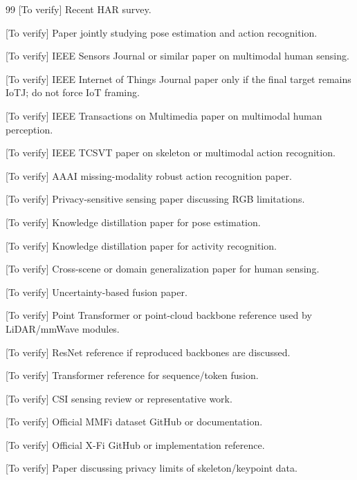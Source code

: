 \documentclass[journal]{IEEEtran}
\begin{document}
\begin{thebibliography}{99}
[To verify] Recent HAR survey.

[To verify] Paper jointly studying pose estimation and action recognition.

[To verify] IEEE Sensors Journal or similar paper on multimodal human sensing.

[To verify] IEEE Internet of Things Journal paper only if the final target remains IoTJ; do not force IoT framing.

[To verify] IEEE Transactions on Multimedia paper on multimodal human perception.

[To verify] IEEE TCSVT paper on skeleton or multimodal action recognition.

[To verify] AAAI missing-modality robust action recognition paper.

[To verify] Privacy-sensitive sensing paper discussing RGB limitations.

[To verify] Knowledge distillation paper for pose estimation.

[To verify] Knowledge distillation paper for activity recognition.

[To verify] Cross-scene or domain generalization paper for human sensing.

[To verify] Uncertainty-based fusion paper.

[To verify] Point Transformer or point-cloud backbone reference used by LiDAR/mmWave modules.

[To verify] ResNet reference if reproduced backbones are discussed.

[To verify] Transformer reference for sequence/token fusion.

[To verify] CSI sensing review or representative work.

[To verify] Official MMFi dataset GitHub or documentation.

[To verify] Official X-Fi GitHub or implementation reference.

[To verify] Paper discussing privacy limits of skeleton/keypoint data.

\end{thebibliography}
\end{document}
